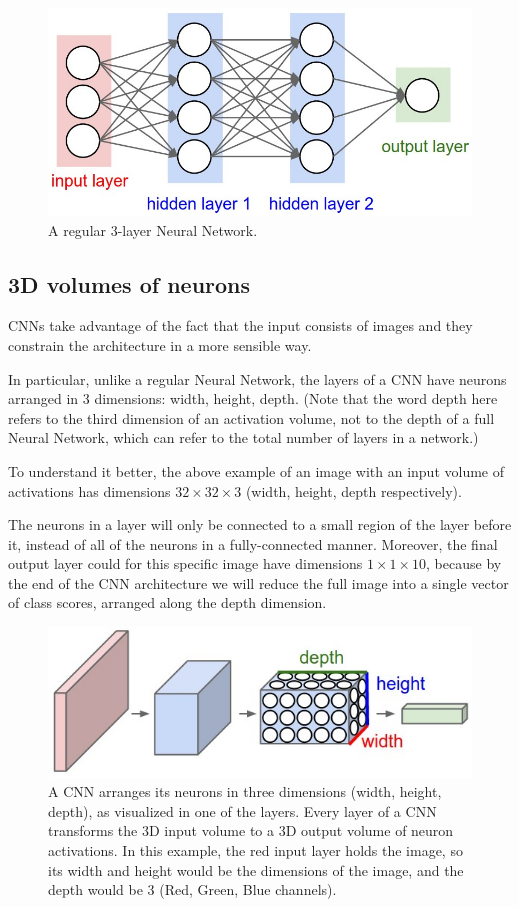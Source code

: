 \documentclass[%
oneside,                 %
final,                   %
10pt]{article}
\begin{document}
\begin{figure}[!ht]  %
  \centerline{\includegraphics[width=0.6\linewidth]{fig/nn.jpeg}}
  \caption{
  A regular 3-layer Neural Network.
  }
\end{figure}


\subsection{3D volumes of neurons}

CNNs take advantage of the fact that the
input consists of images and they constrain the architecture in a more
sensible way. 

In particular, unlike a regular Neural Network, the
layers of a CNN have neurons arranged in 3 dimensions: width,
height, depth. (Note that the word depth here refers to the third
dimension of an activation volume, not to the depth of a full Neural
Network, which can refer to the total number of layers in a network.)

To understand it better, the above example of an image 
with an input volume of
activations has dimensions $32\times 32\times 3$ (width, height,
depth respectively). 

The neurons in a layer will
only be connected to a small region of the layer before it, instead of
all of the neurons in a fully-connected manner. Moreover, the final
output layer could  for this specific image have dimensions $1\times 1 \times 10$, 
because by the
end of the CNN architecture we will reduce the full image into a
single vector of class scores, arranged along the depth
dimension. 


\begin{figure}[!ht]  %
  \centerline{\includegraphics[width=0.6\linewidth]{fig/cnn.jpeg}}
  \caption{
  A CNN arranges its neurons in three dimensions (width, height, depth), as visualized in one of the layers. Every layer of a CNN transforms the 3D input volume to a 3D output volume of neuron activations. In this example, the red input layer holds the image, so its width and height would be the dimensions of the image, and the depth would be 3 (Red, Green, Blue channels).
  }
\end{figure}
\end{document}
